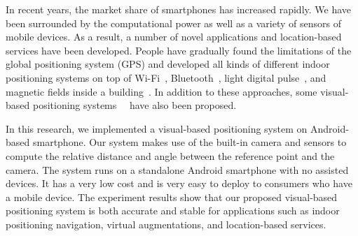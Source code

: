 In recent years, the market share of smartphones has increased rapidly. We have been surrounded by the computational power as well as a variety of sensors of mobile devices. As a result, a number of novel applications and location-based services have been developed. People have gradually found the limitations of the global positioning system (GPS) and developed all kinds of different indoor positioning systems on top of Wi-Fi~\cite{ferris2007wifi}, Bluetooth~\cite{bekkelien2012bluetooth}, light digital pulse~\cite{ganick2013light}, and magnetic fields inside a building~\cite{racoma2013indooratlas}. In addition to these approaches, some visual-based positioning systems~\cite{mulloni2009indoor}~\cite{kawaji2010image} have also been proposed.

In this research, we implemented a visual-based positioning system on Android-based smartphone. Our system makes use of the built-in camera and sensors to compute the relative distance and angle between the reference point and the camera. The system runs on a standalone Android smartphone with no assisted devices. It has a very low cost and is very easy to deploy to consumers who have a mobile device. The experiment results show that our proposed visual-based positioning system is both accurate and stable for applications such as indoor positioning navigation, virtual augmentations, and location-based services.
